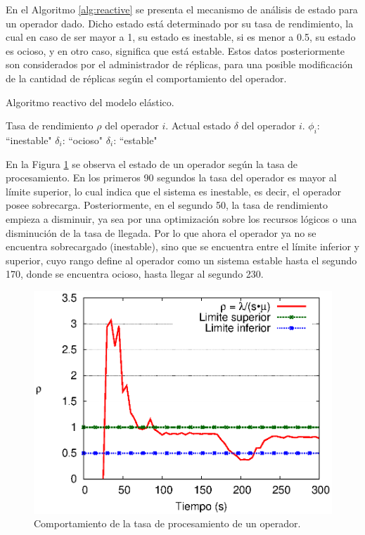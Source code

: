 En el Algoritmo \ref{alg:reactive} se presenta el mecanismo de an\'alisis de estado para un operador dado. Dicho estado est\'a determinado por su tasa de rendimiento, la cual en caso de ser mayor a 1, su estado es inestable, si es menor a 0.5, su estado es ocioso, y en otro caso, significa que est\'a estable. Estos datos posteriormente son considerados por el administrador de r\'eplicas, para una posible modificaci\'on de la cantidad de r\'eplicas seg\'un el comportamiento del operador.

\begin{algorithm}[!ht]
	\caption{Algoritmo reactivo del modelo el\'astico.}
	\label{alg:reactive}
	\begin{algorithmic}[1]
	\REQUIRE Tasa de rendimiento $\rho$ del operador $i$.
	\ENSURE Actual estado $\delta$ del operador $i$.
		\RETURN $\phi_i$: ``inestable"
		\RETURN $\delta_i$: ``ocioso"
	\ELSE
		\RETURN $\delta_i$: ``estable"
	\ENDIF
	\end{algorithmic}
\end{algorithm}

En la Figura \ref{fig:umbrales} se observa el estado de un operador seg\'un la tasa de procesamiento. En los primeros 90 segundos la tasa del operador es mayor al l\'imite superior, lo cual indica que el sistema es inestable, es decir, el operador posee sobrecarga. Posteriormente, en el segundo 50, la tasa de rendimiento empieza a disminuir, ya sea por una optimizaci\'on sobre los recursos l\'ogicos o una disminuci\'on de la tasa de llegada. \normalsize{Por lo que ahora el operador ya no se encuentra sobrecargado (inestable), sino que se encuentra entre el l\'imite inferior y superior, cuyo rango define al operador como un sistema estable hasta el segundo 170, donde se encuentra ocioso, hasta llegar al segundo 230.}

\begin{figure}[ht!]
  \centering
    \includegraphics[scale=0.8]{images/Umbrales.eps}
  \caption{Comportamiento de la tasa de procesamiento de un operador.}
  \label{fig:umbrales}
\end{figure}


